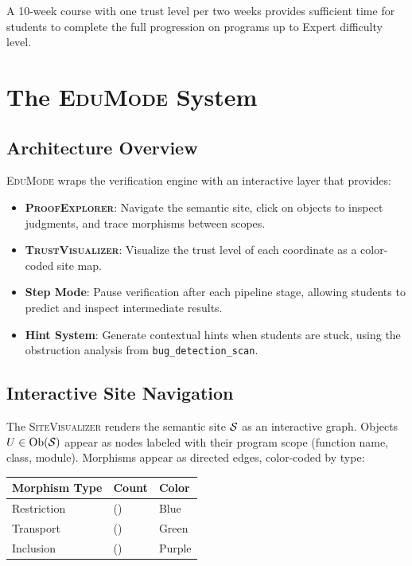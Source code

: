 \documentclass[11pt]{article}
\newcommand{\EduMode}{\textsc{EduMode}}
\newcommand{\ProofExplorer}{\textsc{ProofExplorer}}
\newcommand{\TrustViz}{\textsc{TrustVisualizer}}
\newcommand{\SiteViz}{\textsc{SiteVisualizer}}
\begin{document}
\begin{corollary}
A 10-week course with one trust level per two weeks provides sufficient
time for students to complete the full progression on programs up to
Expert difficulty level.
\end{corollary}

\section{The \EduMode{} System}\label{sec:edumode}

\subsection{Architecture Overview}

\EduMode{} wraps the \JuGeo{} verification engine with an interactive layer
that provides:
\begin{itemize}[leftmargin=*]
  \item \textbf{\ProofExplorer}: Navigate the semantic site, click on
        objects to inspect judgments, and trace morphisms between scopes.
  \item \textbf{\TrustViz}: Visualize the trust level of each coordinate
        as a color-coded site map.
  \item \textbf{Step Mode}: Pause verification after each pipeline stage,
        allowing students to predict and inspect intermediate results.
  \item \textbf{Hint System}: Generate contextual hints when students are
        stuck, using the obstruction analysis from \texttt{bug\_detection\_scan}.
\end{itemize}

\subsection{Interactive Site Navigation}

The \SiteViz{} renders the semantic site $\mathcal{S}$ as an interactive graph.
Objects $U \in \mathrm{Ob}(\mathcal{S})$ appear as nodes labeled with their program scope
(function name, class, module). Morphisms appear as directed edges, color-coded
by type:

\begin{center}
\begin{tabular}{lll}
\toprule
\textbf{Morphism Type} & \textbf{Count} & \textbf{Color} \\
\midrule
Restriction  & \compMorphRestriction{} (\compMorphRestrictionPct{}) &
  {\color{jugeoBlue}Blue} \\
Transport    & \compMorphTransport{} (\compMorphTransportPct{}) &
  {\color{jugeoGreen}Green} \\
Inclusion    & \compMorphInclusion{} (\compMorphInclusionPct{}) &
  {\color{jugeoPurple}Purple} \\
\bottomrule
\end{tabular}
\end{center}
\end{document}
